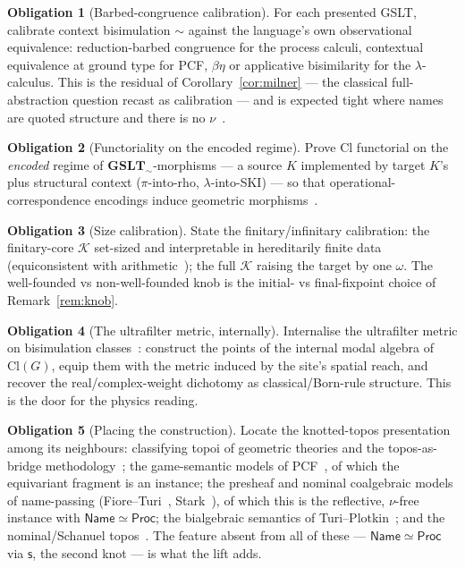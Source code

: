 \documentclass[11pt]{article}
\newcommand{\Proc}{\mathsf{Proc}}
\newcommand{\Name}{\mathsf{Name}}
\newcommand{\GSLTsem}{\mathbf{GSLT}_{\!\sim}}
\newcommand{\Cl}{\mathrm{Cl}}
\newcommand{\swap}{\mathsf{s}}
\newcommand{\Ks}{\mathcal{K}}
\theoremstyle{plain}
\theoremstyle{definition}
\newtheorem{obligation}{Obligation}
\theoremstyle{remark}
\begin{document}
\begin{obligation}[Barbed-congruence calibration]\label{ob:barbed}
For each presented GSLT, calibrate context bisimulation $\sim$ against the language's own observational
equivalence: reduction-barbed congruence for the process calculi, contextual equivalence at ground
type for PCF, $\beta\eta$ or applicative bisimilarity for the $\lambda$-calculus. This is the residual
of Corollary~\ref{cor:milner} --- the classical full-abstraction question recast as calibration ---
and is expected tight where names are quoted structure and there is no $\nu$~\cite[Obl.~6]{knotrho}.
\end{obligation}

\begin{obligation}[Functoriality on the encoded regime]\label{ob:functor}
Prove $\Cl$ functorial on the \emph{encoded} regime of $\GSLTsem$-morphisms --- a source $K$
implemented by target $K$'s plus structural context ($\pi$-into-rho, $\lambda$-into-SKI) --- so that
operational-correspondence encodings induce geometric morphisms~\cite{gsltnotes}.
\end{obligation}

\begin{obligation}[Size calibration]\label{ob:size}
State the finitary/infinitary calibration: the finitary-core $\Ks$ set-sized and interpretable in
hereditarily finite data (equiconsistent with arithmetic~\cite[\S8.2]{rset}); the full $\Ks$ raising
the target by one $\omega$. The well-founded vs non-well-founded knob is the initial- vs final-fixpoint
choice of Remark~\ref{rem:knob}.
\end{obligation}

\begin{obligation}[The ultrafilter metric, internally]\label{ob:metric}
Internalise the ultrafilter metric on bisimulation classes~\cite{gsltnotes}: construct the points of
the internal modal algebra of $\Cl(G)$, equip them with the metric induced by the site's spatial
reach, and recover the real/complex-weight dichotomy as classical/Born-rule structure. This is the
door for the physics reading.
\end{obligation}

\begin{obligation}[Placing the construction]\label{ob:place}
Locate the knotted-topos presentation among its neighbours: classifying topoi of geometric theories
and the topos-as-bridge methodology~\cite{caramello}; the game-semantic models of
PCF~\cite{ajm,ho,girardll}, of which the equivariant fragment is an instance; the presheaf and nominal
coalgebraic models of name-passing (Fiore--Turi~\cite{fioreturi}, Stark~\cite{stark}), of which this is
the reflective, $\nu$-free instance with $\Name\simeq\Proc$; the bialgebraic semantics of
Turi--Plotkin~\cite{turiplotkin}; and the nominal/Schanuel topos~\cite{pitts}. The feature absent from
all of these --- $\Name\simeq\Proc$ via $\swap$, the second knot --- is what the lift adds.
\end{obligation}
\end{document}
